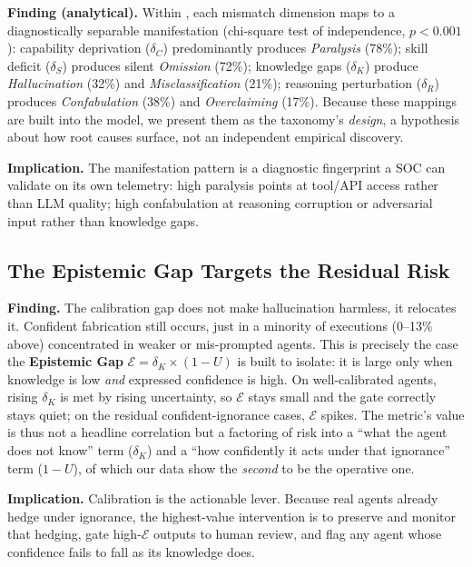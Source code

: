 \textbf{Finding (analytical).} Within \SAFK{}, each mismatch dimension
maps to a diagnostically separable manifestation (chi-square test of
independence, $p < 0.001$): capability deprivation ($\delta_C$)
predominantly produces \textit{Paralysis} (78\%); skill deficit
($\delta_S$) produces silent \textit{Omission} (72\%); knowledge gaps
($\delta_K$) produce \textit{Hallucination} (32\%) and
\textit{Misclassification} (21\%); reasoning perturbation ($\delta_R$)
produces \textit{Confabulation} (38\%) and \textit{Overclaiming}
(17\%). Because these mappings are built into the model, we present them
as the taxonomy's \textit{design}, a hypothesis about how root causes
surface, not an independent empirical discovery.

\textbf{Implication.} The manifestation pattern is a diagnostic
fingerprint a SOC can validate on its own telemetry: high paralysis points
at tool/API access rather than LLM quality; high confabulation at reasoning
corruption or adversarial input rather than knowledge gaps.

\subsection{The Epistemic Gap Targets the Residual Risk}

\textbf{Finding.} The calibration gap does not make hallucination
harmless, it relocates it. Confident fabrication still occurs, just in
a minority of executions (0--13\% above) concentrated in weaker or
mis-prompted agents. This is precisely the case the \textbf{Epistemic
Gap} $\mathcal{E} = \delta_K \times (1 - U)$ is built to isolate: it is
large only when knowledge is low \textit{and} expressed confidence is
high. On well-calibrated agents, rising $\delta_K$ is met by rising
uncertainty, so $\mathcal{E}$ stays small and the gate correctly stays
quiet; on the residual confident-ignorance cases, $\mathcal{E}$ spikes.
The metric's value is thus not a headline correlation but a factoring
of risk into a ``what the agent does not know'' term ($\delta_K$) and a
``how confidently it acts under that ignorance'' term ($1 - U$), of
which our data show the \textit{second} to be the operative one.

\textbf{Implication.} Calibration is the actionable lever. Because
real agents already hedge under ignorance, the highest-value
intervention is to preserve and monitor that hedging, gate high-$\mathcal{E}$
outputs to human review, and flag any agent whose confidence fails to
fall as its knowledge does.


